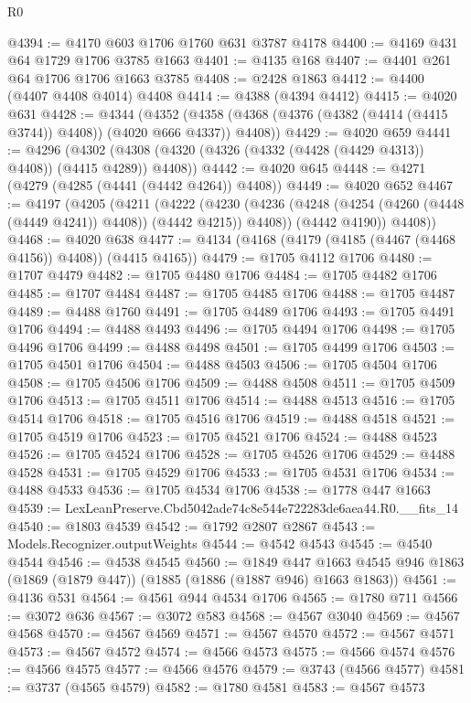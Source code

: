 \begin{lexlean}{R0}
\begin{coremodule}
@4394 := @4170 @603 @1706 @1760 @631 @3787 @4178
@4400 := @4169 @431 @64 @1729 @1706 @3785 @1663
@4401 := @4135 @168
@4407 := @4401 @261 @64 @1706 @1706 @1663 @3785
@4408 := @2428 @1863
@4412 := @4400 (@4407 @4408 @4014) @4408
@4414 := @4388 (@4394 @4412)
@4415 := @4020 @631
@4428 := @4344
    (@4352 (@4358 (@4368 (@4376 (@4382 (@4414 (@4415 @3744)) @4408)) (@4020 @666 @4337)) @4408))
@4429 := @4020 @659
@4441 := @4296
    (@4302 (@4308 (@4320 (@4326 (@4332 (@4428 (@4429 @4313)) @4408)) (@4415 @4289)) @4408))
@4442 := @4020 @645
@4448 := @4271 (@4279 (@4285 (@4441 (@4442 @4264)) @4408))
@4449 := @4020 @652
@4467 := @4197
    (@4205
      (@4211
        (@4222
          (@4230 (@4236 (@4248 (@4254 (@4260 (@4448 (@4449 @4241)) @4408)) (@4442 @4215)) @4408))
          (@4442 @4190))
        @4408))
@4468 := @4020 @638
@4477 := @4134 (@4168 (@4179 (@4185 (@4467 (@4468 @4156)) @4408)) (@4415 @4165))
@4479 := @1705 @4112 @1706
@4480 := @1707 @4479
@4482 := @1705 @4480 @1706
@4484 := @1705 @4482 @1706
@4485 := @1707 @4484
@4487 := @1705 @4485 @1706
@4488 := @1705 @4487
@4489 := @4488 @1760
@4491 := @1705 @4489 @1706
@4493 := @1705 @4491 @1706
@4494 := @4488 @4493
@4496 := @1705 @4494 @1706
@4498 := @1705 @4496 @1706
@4499 := @4488 @4498
@4501 := @1705 @4499 @1706
@4503 := @1705 @4501 @1706
@4504 := @4488 @4503
@4506 := @1705 @4504 @1706
@4508 := @1705 @4506 @1706
@4509 := @4488 @4508
@4511 := @1705 @4509 @1706
@4513 := @1705 @4511 @1706
@4514 := @4488 @4513
@4516 := @1705 @4514 @1706
@4518 := @1705 @4516 @1706
@4519 := @4488 @4518
@4521 := @1705 @4519 @1706
@4523 := @1705 @4521 @1706
@4524 := @4488 @4523
@4526 := @1705 @4524 @1706
@4528 := @1705 @4526 @1706
@4529 := @4488 @4528
@4531 := @1705 @4529 @1706
@4533 := @1705 @4531 @1706
@4534 := @4488 @4533
@4536 := @1705 @4534 @1706
@4538 := @1778 @447 @1663
@4539 := LexLeanPreserve.Cbd5042ade74c8e544e722283de6aea44.R0.__fits_14
@4540 := @1803 @4539
@4542 := @1792 @2807 @2867
@4543 := Models.Recognizer.outputWeights
@4544 := @4542 @4543
@4545 := @4540 @4544
@4546 := @4538 @4545
@4560 := @1849
    @447
    @1663
    @4545
    @946
    @1863
    (@1869 (@1879 @447))
    (@1885 (@1886 (@1887 @946) @1663 @1863))
@4561 := @4136 @531
@4564 := @4561 @944 @4534 @1706
@4565 := @1780 @711
@4566 := @3072 @636
@4567 := @3072 @583
@4568 := @4567 @3040
@4569 := @4567 @4568
@4570 := @4567 @4569
@4571 := @4567 @4570
@4572 := @4567 @4571
@4573 := @4567 @4572
@4574 := @4566 @4573
@4575 := @4566 @4574
@4576 := @4566 @4575
@4577 := @4566 @4576
@4579 := @3743 (@4566 @4577)
@4581 := @3737 (@4565 @4579)
@4582 := @1780 @4581
@4583 := @4567 @4573

\end{coremodule}
\end{lexlean}
